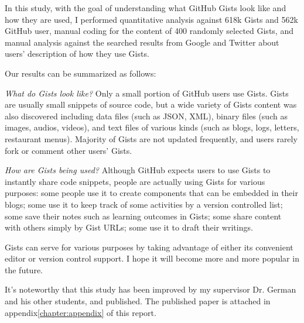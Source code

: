 In this study, with the goal of understanding what GitHub Gists look like and how they are used, I performed quantitative analysis against 618k Gists and 562k GitHub user, manual coding for the content of 400 randomly selected Gists, and manual analysis against the searched results from Google and Twitter about users' description of how they use Gists. 

Our results can be summarized as follows:

\textsl{What do Gists look like?} Only a small portion of GitHub users use Gists. Gists are usually small snippets of source code, but a wide variety of Gists content was also discovered including data files (such as JSON, XML), binary files (such as images, audios, videos), and text files of various kinds (such as blogs, logs, letters, restaurant menus). Majority of Gists are not updated frequently, and users rarely fork or comment other users' Gists.

\textsl{How are Gists being used?} Although GitHub expects users to use Gists to instantly share code snippets, people are actually using Gists for various purposes: some people use it to create components that can be embedded in their blogs; some use it to keep track of some activities by a version controlled list; some save their notes such as learning outcomes in Gists; some share content with others simply by Gist URLs; some use it to draft their writings.

Gists can serve for various purposes by taking advantage of either its convenient editor or version control support. I hope it will become more and more popular in the future.

It's noteworthy that this study has been improved by my supervisor Dr. German and his other students, and published\cite{7180090}. The published paper is attached in appendix\ref{chapter:appendix} of this report.
